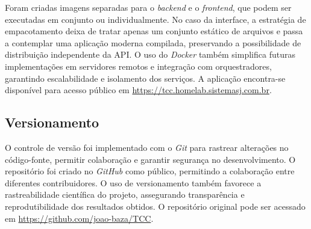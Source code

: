 Foram criadas imagens separadas para o \textit{backend} e o \textit{frontend}, que podem ser executadas em conjunto ou individualmente. No caso da interface, a estratégia de empacotamento deixa de tratar apenas um conjunto estático de arquivos e passa a contemplar uma aplicação moderna compilada, preservando a possibilidade de distribuição independente da API. O uso do \textit{Docker} também simplifica futuras implementações em servidores remotos e integração com orquestradores, garantindo escalabilidade e isolamento dos serviços. A aplicação encontra-se disponível para acesso público em \url{https://tcc.homelab.sistemasj.com.br}.

\subsection{Versionamento}
O controle de versão foi implementado com o \textit{Git} para rastrear alterações no código-fonte, permitir colaboração e garantir segurança no desenvolvimento. O repositório foi criado no \textit{GitHub} como público, permitindo a colaboração entre diferentes contribuidores. O uso de versionamento também favorece a rastreabilidade científica do projeto, assegurando transparência e reprodutibilidade dos resultados obtidos. O repositório original pode ser acessado em \url{https://github.com/joao-baza/TCC}.
